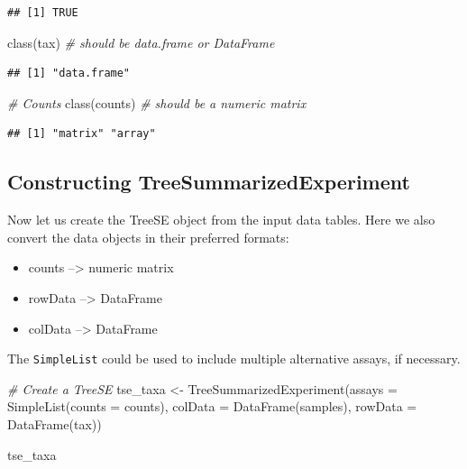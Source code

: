 \documentclass[
]{book}
\newenvironment{Shaded}{\begin{snugshade}}{\end{snugshade}}
\newcommand{\AttributeTok}[1]{\textcolor[rgb]{0.77,0.63,0.00}{#1}}
\newcommand{\CommentTok}[1]{\textcolor[rgb]{0.56,0.35,0.01}{\textit{#1}}}
\newcommand{\FunctionTok}[1]{\textcolor[rgb]{0.00,0.00,0.00}{#1}}
\newcommand{\NormalTok}[1]{#1}
\newcommand{\OtherTok}[1]{\textcolor[rgb]{0.56,0.35,0.01}{#1}}
\providecommand{\tightlist}{%
  \setlength{\itemsep}{0pt}\setlength{\parskip}{0pt}}
\begin{document}
\begin{verbatim}
## [1] TRUE
\end{verbatim}

\begin{Shaded}
\begin{Highlighting}[]
\FunctionTok{class}\NormalTok{(tax) }\CommentTok{\# should be data.frame or DataFrame}
\end{Highlighting}
\end{Shaded}

\begin{verbatim}
## [1] "data.frame"
\end{verbatim}

\begin{Shaded}
\begin{Highlighting}[]
\CommentTok{\# Counts }
\FunctionTok{class}\NormalTok{(counts) }\CommentTok{\# should be a numeric matrix}
\end{Highlighting}
\end{Shaded}

\begin{verbatim}
## [1] "matrix" "array"
\end{verbatim}

\hypertarget{constructing-treesummarizedexperiment}{%
\subsection{Constructing TreeSummarizedExperiment}\label{constructing-treesummarizedexperiment}}

Now let us create the TreeSE object from the input data tables. Here
we also convert the data objects in their preferred formats:

\begin{itemize}
\tightlist
\item
  counts --\textgreater{} numeric matrix
\item
  rowData --\textgreater{} DataFrame
\item
  colData --\textgreater{} DataFrame
\end{itemize}

The \texttt{SimpleList} could be used to include multiple alternative assays, if
necessary.

\begin{Shaded}
\begin{Highlighting}[]
\CommentTok{\# Create a TreeSE}
\NormalTok{tse\_taxa }\OtherTok{\textless{}{-}} \FunctionTok{TreeSummarizedExperiment}\NormalTok{(}\AttributeTok{assays =}  \FunctionTok{SimpleList}\NormalTok{(}\AttributeTok{counts =}\NormalTok{ counts),}
                                     \AttributeTok{colData =} \FunctionTok{DataFrame}\NormalTok{(samples),}
                                     \AttributeTok{rowData =} \FunctionTok{DataFrame}\NormalTok{(tax))}

\NormalTok{tse\_taxa}
\end{Highlighting}
\end{Shaded}
\end{document}
